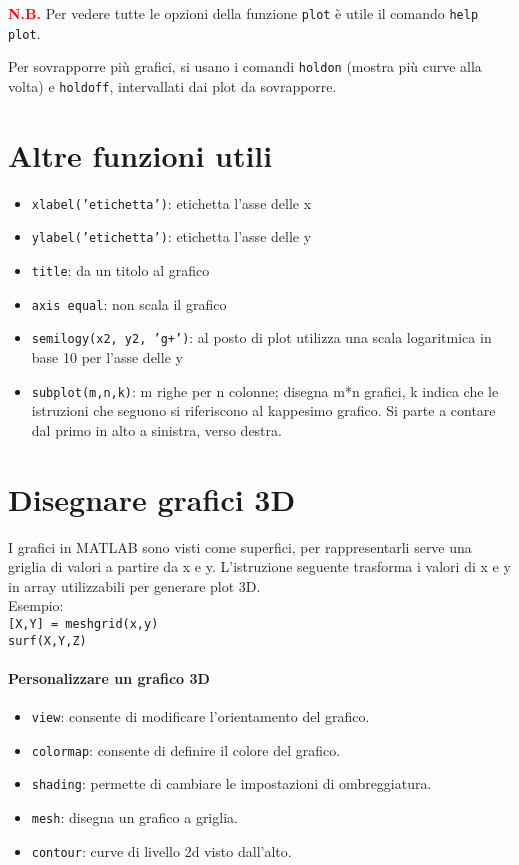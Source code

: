 \textcolor{Red}{\textbf{N.B.}} Per vedere tutte le opzioni della funzione \texttt{plot} è utile il comando 
\texttt{help plot}.

Per sovrapporre più grafici, si usano i comandi \texttt{holdon} (mostra più curve alla volta) e \texttt{holdoff}, 
intervallati dai plot da sovrapporre.

\section{Altre funzioni utili}

\begin{itemize}
    \item \texttt{xlabel('etichetta')}: etichetta l'asse delle x
    \item \texttt{ylabel('etichetta')}: etichetta l'asse delle y
    \item \texttt{title}: da un titolo al grafico
    \item \texttt{axis equal}: non scala il grafico
    \item \texttt{semilogy(x2, y2, 'g+')}: al posto di plot utilizza una scala logaritmica in base 10 per l'asse delle y
    \item \texttt{subplot(m,n,k)}: m righe per n colonne; disegna m*n grafici, k indica che le istruzioni che seguono 
    si riferiscono al kappesimo grafico. Si parte a contare dal primo in alto a sinistra, verso destra.
\end{itemize}

\section{Disegnare grafici 3D}
I grafici in MATLAB sono visti come superfici, per rappresentarli serve una griglia di valori a partire da x e y.
L'istruzione seguente trasforma i valori di x e y in array utilizzabili per generare plot 3D. \\
 
Esempio:\\
\texttt{[X,Y] = meshgrid(x,y)}\\
\texttt{surf(X,Y,Z)}

\paragraph{Personalizzare un grafico 3D}

\begin{itemize}
    \item \texttt{view}: consente di modificare l'orientamento del grafico.
    \item \texttt{colormap}: consente di definire il colore del grafico.
    \item \texttt{shading}: permette di cambiare le impostazioni di ombreggiatura.
    \item \texttt{mesh}: disegna un grafico a griglia.
    \item \texttt{contour}: curve di livello 2d visto dall'alto.
\end{itemize}